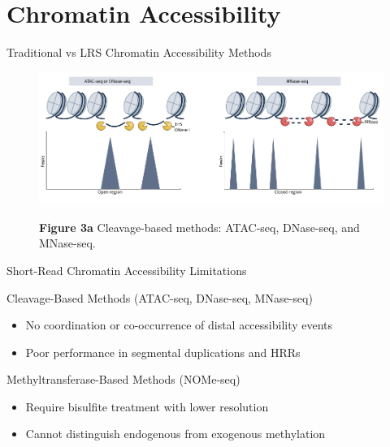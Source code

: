 \documentclass[aspectratio=169]{beamer}
\begin{document}
\section{Chromatin Accessibility}

\begin{frame}{Traditional vs LRS Chromatin Accessibility Methods}
  \begin{figure}
    \centering
    \includegraphics[height=0.5\textheight]{figures/fig3a.pdf}

    {\small \textbf{Figure 3a} \textbar{} Cleavage-based methods: ATAC-seq, DNase-seq, and MNase-seq.}
  \end{figure}
\end{frame}

\begin{frame}{Short-Read Chromatin Accessibility Limitations}
  \begin{block}{Cleavage-Based Methods (ATAC-seq, DNase-seq, MNase-seq)}
    \begin{itemize}
      \item No coordination or co-occurrence of distal accessibility events
      \item Poor performance in segmental duplications and HRRs
    \end{itemize}
  \end{block}

  \begin{block}{Methyltransferase-Based Methods (NOMe-seq)}
    \begin{itemize}
      \item Require bisulfite treatment with lower resolution
      \item Cannot distinguish endogenous from exogenous methylation
    \end{itemize}
  \end{block}
\end{frame}
\end{document}
